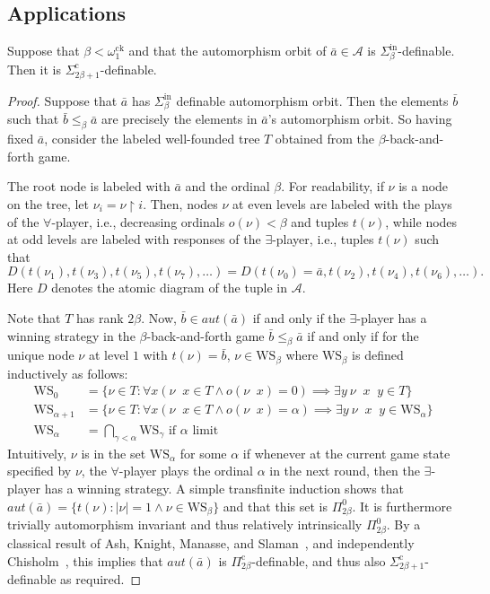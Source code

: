 \documentclass{amsart}
\newcommand\+[1]{\mathcal{#1}}
\renewcommand\*[1]{\mathbf{#1}}
\renewcommand\=[1]{\text{#1}}
\renewcommand\*[1]{\mathbf{#1}}
\newcommand{\A}{\mathcal{A}}
\newcommand{\Picom}[1]{\Pi^{\mathrm{c}}_{#1}}
\newcommand{\Sinf}[1]{\Sigma^{\mathrm{in}}_{#1}}
\newcommand{\Sicom}[1]{\Sigma^{\mathrm{c}}_{#1}}
\newcommand{\ba}{\bar a}
\newcommand{\ock}{\omega_{1}^{\mathrm{ck}}}
\DeclareMathOperator{\restrict}{\upharpoonright}
\DeclareMathOperator{\concat}{^\smallfrown}
\begin{document}
\subsection{Applications}\label{subsec:indexsetcalculations}
\begin{lemma}\label{lem:alphato2alpha}
  Suppose that $\beta < \ock$ and that the automorphism orbit of $\ba\in \A$ is $\Sinf{\beta}$-definable. Then it is $\Sicom{2\beta+1}$-definable.
\end{lemma}
\begin{proof}
 Suppose that $\bar a$ has $\Sinf{\beta}$ definable automorphism orbit. Then the elements $\bar b$ such that $\bar b\leq_\beta\bar a$ are precisely the elements in $\bar a$'s automorphism orbit. So having fixed $\bar a$, consider the labeled well-founded tree $T$ obtained from the $\beta$-back-and-forth game.

  The root node is labeled with $\bar a$ and the ordinal $\beta$. For readability, if $\nu$ is a node on the tree, let $\nu_i=\nu\restrict i$. Then, nodes $\nu$ at even levels are labeled with the plays of the $\forall$-player, i.e., decreasing ordinals $o(\nu)<\beta$ and tuples $t(\nu)$, while nodes at odd levels are labeled with responses of the $\exists$-player, i.e., tuples $t(\nu)$ such that
  \[
    D(t(\nu_1),t(\nu_3),t(\nu_5),t(\nu_7),\dots)=D(t(\nu_0)=\bar a,t(\nu_2),t(\nu_4),t(\nu_6), \dots).
  \]
  Here $D$ denotes the atomic diagram of the tuple in $\+A$.
  
  Note that $T$ has rank $2\beta$. 
  Now, $\bar b\in aut(\bar a)$ if and only if the $\exists$-player has a winning strategy in the $\beta$-back-and-forth game $\bar b\leq_\beta \bar a$ if and only if for the unique node $\nu$ at level $1$ with $t(\nu)=\bar b$, $\nu\in \mathrm{WS}_\beta$ where $\mathrm{WS}_\beta$ is defined inductively as follows:
  \begin{align*}
    \mathrm{WS}_0&=\{ \nu\in T: \forall x (\nu\concat x\in T \land o(\nu\concat x)=0)\implies \exists y\ \nu\concat x\concat y\in T\}\\
    \mathrm{WS}_{\alpha+1}&=\{ \nu\in T: \forall x (\nu\concat x\in T \land o(\nu\concat x)=\alpha)\implies \exists y\ \nu\concat x\concat y\in \mathrm{WS}_\alpha\}\\
    \mathrm{WS}_{\alpha}&=\bigcap_{\gamma<\alpha} \mathrm{WS}_\gamma \text{ if $\alpha$ limit}
  \end{align*}
  Intuitively, $\nu$ is in the set $\mathrm{WS}_{\alpha}$ for some $\alpha$ if whenever at the current game state specified by $\nu$, the $\forall$-player plays the ordinal $\alpha$ in the next round, then the $\exists$-player has a winning strategy.
  A simple transfinite induction shows that $aut(\bar a)=\{t(\nu): |\nu|=1\land \nu\in \mathrm{WS}_\beta\}$ and that this set is $\Pi^0_{2\beta}$. It is furthermore trivially automorphism invariant and thus relatively intrinsically $\Pi^0_{2\beta}$. By a classical result of Ash, Knight, Manasse, and Slaman~\cite{ash1989}, and independently Chisholm~\cite{chisholm1990}, this implies that $aut(\bar a)$ is $\Picom{2\beta}$-definable, and thus also $\Sicom{2\beta+1}$-definable as required.
\end{proof}
\end{document}
